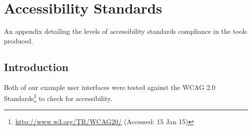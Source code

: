\chapter{Accessibility Standards} 
\label{Chapter:Accessibility Standards}

An appendix detailing the levels of accessibility standards compliance in the tools produced.

\begin{preamble}
\end{preamble}

\section{Introduction}

Both of our example user interfaces were tested against the \gls{WCAG} 2.0 Standards\footnote{\url{http://www.w3.org/TR/WCAG20/} (Accessed: 15 Jan 15)} to check for accessibility.

